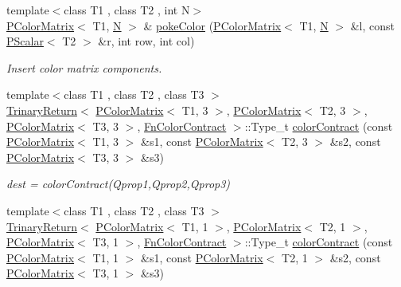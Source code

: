 \begin{DoxyCompactItemize}
\item 
{\footnotesize template$<$class T1 , class T2 , int N$>$ }\\\mbox{\hyperlink{classENSEM_1_1PColorMatrix}{P\+Color\+Matrix}}$<$ T1, \mbox{\hyperlink{operator__name__util_8cc_a7722c8ecbb62d99aee7ce68b1752f337}{N}} $>$ \& \mbox{\hyperlink{group__primcolormatrix_ga83e068e757a42e9866992b38a003d7f9}{poke\+Color}} (\mbox{\hyperlink{classENSEM_1_1PColorMatrix}{P\+Color\+Matrix}}$<$ T1, \mbox{\hyperlink{operator__name__util_8cc_a7722c8ecbb62d99aee7ce68b1752f337}{N}} $>$ \&l, const \mbox{\hyperlink{classENSEM_1_1PScalar}{P\+Scalar}}$<$ T2 $>$ \&r, int row, int col)
\begin{DoxyCompactList}\small\item\em Insert color matrix components. \end{DoxyCompactList}\item 
{\footnotesize template$<$class T1 , class T2 , class T3 $>$ }\\\mbox{\hyperlink{structENSEM_1_1TrinaryReturn}{Trinary\+Return}}$<$ \mbox{\hyperlink{classENSEM_1_1PColorMatrix}{P\+Color\+Matrix}}$<$ T1, 3 $>$, \mbox{\hyperlink{classENSEM_1_1PColorMatrix}{P\+Color\+Matrix}}$<$ T2, 3 $>$, \mbox{\hyperlink{classENSEM_1_1PColorMatrix}{P\+Color\+Matrix}}$<$ T3, 3 $>$, \mbox{\hyperlink{structENSEM_1_1FnColorContract}{Fn\+Color\+Contract}} $>$\+::Type\+\_\+t \mbox{\hyperlink{group__primcolormatrix_ga200705dac956b2d421ea1793fdb916b9}{color\+Contract}} (const \mbox{\hyperlink{classENSEM_1_1PColorMatrix}{P\+Color\+Matrix}}$<$ T1, 3 $>$ \&s1, const \mbox{\hyperlink{classENSEM_1_1PColorMatrix}{P\+Color\+Matrix}}$<$ T2, 3 $>$ \&s2, const \mbox{\hyperlink{classENSEM_1_1PColorMatrix}{P\+Color\+Matrix}}$<$ T3, 3 $>$ \&s3)
\begin{DoxyCompactList}\small\item\em dest = color\+Contract(\+Qprop1,\+Qprop2,\+Qprop3) \end{DoxyCompactList}\item 
{\footnotesize template$<$class T1 , class T2 , class T3 $>$ }\\\mbox{\hyperlink{structENSEM_1_1TrinaryReturn}{Trinary\+Return}}$<$ \mbox{\hyperlink{classENSEM_1_1PColorMatrix}{P\+Color\+Matrix}}$<$ T1, 1 $>$, \mbox{\hyperlink{classENSEM_1_1PColorMatrix}{P\+Color\+Matrix}}$<$ T2, 1 $>$, \mbox{\hyperlink{classENSEM_1_1PColorMatrix}{P\+Color\+Matrix}}$<$ T3, 1 $>$, \mbox{\hyperlink{structENSEM_1_1FnColorContract}{Fn\+Color\+Contract}} $>$\+::Type\+\_\+t \mbox{\hyperlink{group__primcolormatrix_ga89c3eb4b75063bbb9022ef9b699765dd}{color\+Contract}} (const \mbox{\hyperlink{classENSEM_1_1PColorMatrix}{P\+Color\+Matrix}}$<$ T1, 1 $>$ \&s1, const \mbox{\hyperlink{classENSEM_1_1PColorMatrix}{P\+Color\+Matrix}}$<$ T2, 1 $>$ \&s2, const \mbox{\hyperlink{classENSEM_1_1PColorMatrix}{P\+Color\+Matrix}}$<$ T3, 1 $>$ \&s3)

\end{DoxyCompactItemize}
